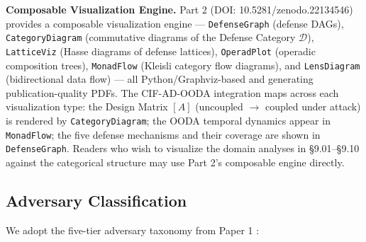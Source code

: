\documentclass[
]{article}
\newcommand{\calD}{\mathcal{D}}
\begin{document}
\textbf{Composable Visualization Engine.} Part 2 (DOI:
10.5281/zenodo.22134546) provides a composable visualization engine ---
\texttt{DefenseGraph} (defense DAGs), \texttt{CategoryDiagram}
(commutative diagrams of the Defense Category \(\calD\)),
\texttt{LatticeViz} (Hasse diagrams of defense lattices),
\texttt{OperadPlot} (operadic composition trees), \texttt{MonadFlow}
(Kleisli category flow diagrams), and \texttt{LensDiagram}
(bidirectional data flow) --- all Python/Graphviz-based and generating
publication-quality PDFs. The CIF-AD-OODA integration maps across each
visualization type: the Design Matrix \([A]\) (uncoupled \texorpdfstring{\ensuremath{\to}}{->} coupled under
attack) is rendered by \texttt{CategoryDiagram}; the OODA temporal
dynamics appear in \texttt{MonadFlow}; the five defense mechanisms and
their coverage are shown in \texttt{DefenseGraph}. Readers who wish to
visualize the domain analyses in §9.01--§9.10 against the categorical
structure may use Part 2's composable engine directly.

\subsection{Adversary Classification}\label{adversary-classification}

We adopt the five-tier adversary taxonomy from Paper 1
\cite{friedman2026cogsec1}:
\end{document}
